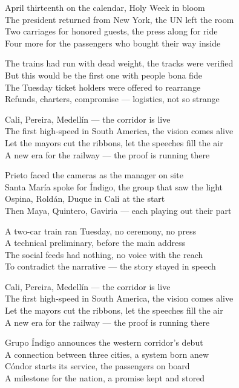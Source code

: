 \begin{lyrics}
April thirteenth on the calendar, Holy Week in bloom\\
The president returned from New York, the UN left the room\\
Two carriages for honored guests, the press along for ride\\
Four more for the passengers who bought their way inside

The trains had run with dead weight, the tracks were verified\\
But this would be the first one with people bona fide\\
The Tuesday ticket holders were offered to rearrange\\
Refunds, charters, compromise — logistics, not so strange

Cali, Pereira, Medellín — the corridor is live\\
The first high-speed in South America, the vision comes alive\\
Let the mayors cut the ribbons, let the speeches fill the air\\
A new era for the railway — the proof is running there

Prieto faced the cameras as the manager on site\\
Santa María spoke for Índigo, the group that saw the light\\
Ospina, Roldán, Duque in Cali at the start\\
Then Maya, Quintero, Gaviria — each playing out their part

A two-car train ran Tuesday, no ceremony, no press\\
A technical preliminary, before the main address\\
The social feeds had nothing, no voice with the reach\\
To contradict the narrative — the story stayed in speech

Cali, Pereira, Medellín — the corridor is live\\
The first high-speed in South America, the vision comes alive\\
Let the mayors cut the ribbons, let the speeches fill the air\\
A new era for the railway — the proof is running there

Grupo Índigo announces the western corridor's debut\\
A connection between three cities, a system born anew\\
Cóndor starts its service, the passengers on board\\
A milestone for the nation, a promise kept and stored


\end{lyrics}
